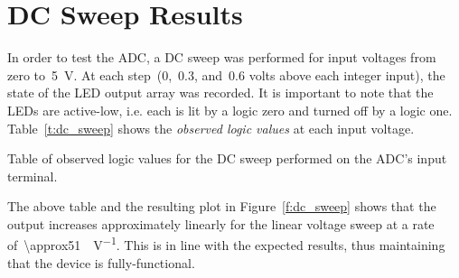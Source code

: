 \section{DC Sweep Results}
In order to test the ADC, a DC sweep was performed for input voltages from zero
to~\SI{5}{\volt}.  At each step~(0,~0.3, and~0.6 volts above each integer
input), the state of the LED output array was recorded.  It is important to
note that the LEDs are active-low, i.e. each is lit by a logic zero and turned
off by a logic one.  Table~\ref{t:dc_sweep} shows the \emph{observed logic
values} at each input voltage.
%
\begin{table}[H]
\centering
	
	\parbox{.6\textwidth}{
	\caption[DC sweep results]{Table of observed logic values for the DC sweep
	performed on the ADC's input terminal.}
	\label{t:dc_sweep}}
\end{table}
%
The above table and the resulting plot in Figure~\ref{f:dc_sweep} shows that
the output increases approximately linearly for the linear voltage sweep at a
rate of~\SI{\approx51}{\bit\per\volt}.  This is in line with the expected results,
thus maintaining that the device is fully-functional.
